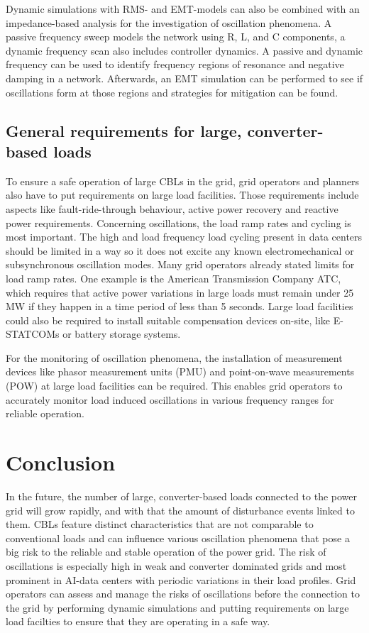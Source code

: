 \documentclass[conference]{IEEEtran}
\begin{document}
Dynamic simulations with RMS- and EMT-models can also be combined with an impedance-based analysis for the investigation of oscillation phenomena. A passive frequency sweep models the network using R, L, and C components, a dynamic frequency scan also includes controller dynamics. A passive and dynamic frequency can be used to identify frequency regions of resonance and negative damping in a network. Afterwards, an EMT simulation can be performed to see if oscillations form at those regions and strategies for mitigation can be found.\cite{rmsenergy}

\subsection{General requirements for large, converter-based loads}
To ensure a safe operation of large CBLs in the grid, grid operators and planners also have to put requirements on large load facilities. Those requirements include aspects like fault-ride-through behaviour, active power recovery and reactive power requirements. Concerning oscillations, the load ramp rates and cycling is most important. The high and load frequency load cycling present in data centers should be limited in a way so it does not excite any known electromechanical or subsynchronous oscillation modes. Many grid operators already stated limits for load ramp rates. One example is the American Transmission Company ATC, which requires that active power variations in large loads must remain under 25 MW if they happen in a time period of less than 5 seconds. Large load facilities could also be required to install suitable compensation devices on-site, like E-STATCOMs or battery storage systems.\cite{recomm} 

For the monitoring of oscillation phenomena, the installation of measurement devices like phasor measurement units (PMU) and point-on-wave measurements (POW) at large load facilities can be required. This enables grid operators to accurately monitor load induced oscillations in various frequency ranges for reliable operation.\cite{recomm}\cite{pnnl}


\section{Conclusion}
In the future, the number of large, converter-based loads connected to the power grid will grow rapidly, and with that the amount of disturbance events linked to them. CBLs feature distinct characteristics that are not comparable to conventional loads and can influence various oscillation phenomena that pose a big risk to the reliable and stable operation of the power grid. The risk of oscillations is especially high in weak and converter dominated grids and most prominent in AI-data centers with periodic variations in their load profiles. Grid operators can assess and manage the risks of oscillations before the connection to the grid by performing dynamic simulations and putting requirements on large load facilties to ensure that they are operating in a safe way.





\printbibliography
\end{document}
